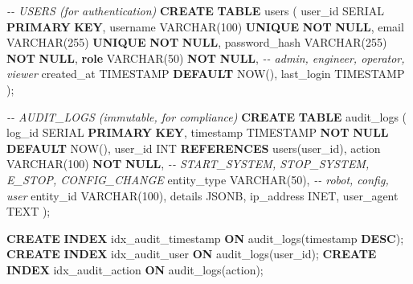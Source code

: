 \documentclass[
]{article}
\newenvironment{Shaded}{\begin{snugshade}}{\end{snugshade}}
\newcommand{\CommentTok}[1]{\textcolor[rgb]{0.56,0.35,0.01}{\textit{#1}}}
\newcommand{\DataTypeTok}[1]{\textcolor[rgb]{0.13,0.29,0.53}{#1}}
\newcommand{\DecValTok}[1]{\textcolor[rgb]{0.00,0.00,0.81}{#1}}
\newcommand{\KeywordTok}[1]{\textcolor[rgb]{0.13,0.29,0.53}{\textbf{#1}}}
\newcommand{\NormalTok}[1]{#1}
\begin{document}
\begin{Shaded}
\begin{Highlighting}[]
\CommentTok{{-}{-} USERS (for authentication)}
\KeywordTok{CREATE} \KeywordTok{TABLE}\NormalTok{ users (}
\NormalTok{    user\_id SERIAL }\KeywordTok{PRIMARY} \KeywordTok{KEY}\NormalTok{,}
\NormalTok{    username }\DataTypeTok{VARCHAR}\NormalTok{(}\DecValTok{100}\NormalTok{) }\KeywordTok{UNIQUE} \KeywordTok{NOT} \KeywordTok{NULL}\NormalTok{,}
\NormalTok{    email }\DataTypeTok{VARCHAR}\NormalTok{(}\DecValTok{255}\NormalTok{) }\KeywordTok{UNIQUE} \KeywordTok{NOT} \KeywordTok{NULL}\NormalTok{,}
\NormalTok{    password\_hash }\DataTypeTok{VARCHAR}\NormalTok{(}\DecValTok{255}\NormalTok{) }\KeywordTok{NOT} \KeywordTok{NULL}\NormalTok{,}
    \KeywordTok{role} \DataTypeTok{VARCHAR}\NormalTok{(}\DecValTok{50}\NormalTok{) }\KeywordTok{NOT} \KeywordTok{NULL}\NormalTok{,  }\CommentTok{{-}{-} \textquotesingle{}admin\textquotesingle{}, \textquotesingle{}engineer\textquotesingle{}, \textquotesingle{}operator\textquotesingle{}, \textquotesingle{}viewer\textquotesingle{}}
\NormalTok{    created\_at }\DataTypeTok{TIMESTAMP} \KeywordTok{DEFAULT}\NormalTok{ NOW(),}
\NormalTok{    last\_login }\DataTypeTok{TIMESTAMP}
\NormalTok{);}

\CommentTok{{-}{-} AUDIT\_LOGS (immutable, for compliance)}
\KeywordTok{CREATE} \KeywordTok{TABLE}\NormalTok{ audit\_logs (}
\NormalTok{    log\_id SERIAL }\KeywordTok{PRIMARY} \KeywordTok{KEY}\NormalTok{,}
    \DataTypeTok{timestamp} \DataTypeTok{TIMESTAMP} \KeywordTok{NOT} \KeywordTok{NULL} \KeywordTok{DEFAULT}\NormalTok{ NOW(),}
\NormalTok{    user\_id }\DataTypeTok{INT} \KeywordTok{REFERENCES}\NormalTok{ users(user\_id),}
\NormalTok{    action }\DataTypeTok{VARCHAR}\NormalTok{(}\DecValTok{100}\NormalTok{) }\KeywordTok{NOT} \KeywordTok{NULL}\NormalTok{,  }\CommentTok{{-}{-} \textquotesingle{}START\_SYSTEM\textquotesingle{}, \textquotesingle{}STOP\_SYSTEM\textquotesingle{}, \textquotesingle{}E\_STOP\textquotesingle{}, \textquotesingle{}CONFIG\_CHANGE\textquotesingle{}}
\NormalTok{    entity\_type }\DataTypeTok{VARCHAR}\NormalTok{(}\DecValTok{50}\NormalTok{),  }\CommentTok{{-}{-} \textquotesingle{}robot\textquotesingle{}, \textquotesingle{}config\textquotesingle{}, \textquotesingle{}user\textquotesingle{}}
\NormalTok{    entity\_id }\DataTypeTok{VARCHAR}\NormalTok{(}\DecValTok{100}\NormalTok{),}
\NormalTok{    details JSONB,}
\NormalTok{    ip\_address INET,}
\NormalTok{    user\_agent TEXT}
\NormalTok{);}

\KeywordTok{CREATE} \KeywordTok{INDEX}\NormalTok{ idx\_audit\_timestamp }\KeywordTok{ON}\NormalTok{ audit\_logs(}\DataTypeTok{timestamp} \KeywordTok{DESC}\NormalTok{);}
\KeywordTok{CREATE} \KeywordTok{INDEX}\NormalTok{ idx\_audit\_user }\KeywordTok{ON}\NormalTok{ audit\_logs(user\_id);}
\KeywordTok{CREATE} \KeywordTok{INDEX}\NormalTok{ idx\_audit\_action }\KeywordTok{ON}\NormalTok{ audit\_logs(action);}
\end{Highlighting}
\end{Shaded}
\end{document}
